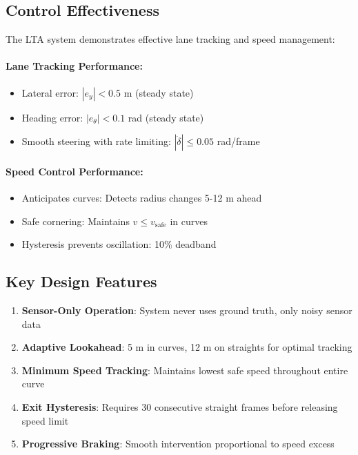 \documentclass[11pt,a4paper]{article}
\begin{document}
\subsection{Control Effectiveness}

The LTA system demonstrates effective lane tracking and speed management:

\paragraph{Lane Tracking Performance:}
\begin{itemize}
    \item Lateral error: $|e_y| < 0.5$ m (steady state)
    \item Heading error: $|e_\theta| < 0.1$ rad (steady state)
    \item Smooth steering with rate limiting: $|\dot{\delta}| \leq 0.05$ rad/frame
\end{itemize}

\paragraph{Speed Control Performance:}
\begin{itemize}
    \item Anticipates curves: Detects radius changes 5-12 m ahead
    \item Safe cornering: Maintains $v \leq v_{\text{safe}}$ in curves
    \item Hysteresis prevents oscillation: 10\% deadband
\end{itemize}

\subsection{Key Design Features}

\begin{enumerate}
    \item \textbf{Sensor-Only Operation}: System never uses ground truth, only noisy sensor data
    \item \textbf{Adaptive Lookahead}: 5 m in curves, 12 m on straights for optimal tracking
    \item \textbf{Minimum Speed Tracking}: Maintains lowest safe speed throughout entire curve
    \item \textbf{Exit Hysteresis}: Requires 30 consecutive straight frames before releasing speed limit
    \item \textbf{Progressive Braking}: Smooth intervention proportional to speed excess
\end{enumerate}
\end{document}

